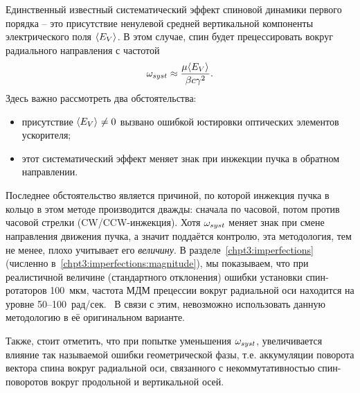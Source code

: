 Единственный известный систематический эффект спиновой динамики
первого порядка -- это присутствие ненулевой средней вертикальной
компоненты электрического поля $\avg{E_V}$. В этом случае, спин будет
прецессировать вокруг радиального направления с частотой~\cite[стр.~11]{BNL:Deuteron2008}
\[
\w_{syst} \approx \frac{\mu\avg{E_V}}{\beta c\gamma^2}.
\]
Здесь важно рассмотреть два обстоятельства:
\begin{itemize}
\item присутствие $\avg{E_V}\neq 0$ вызвано ошибкой юстировки оптических
  элементов ускорителя;
\item этот систематический эффект меняет знак при инжекции пучка в
  обратном направлении.
\end{itemize}
Последнее обстоятельство является причиной, по которой инжекция пучка
в кольцо в этом методе производится дважды: сначала по часовой, потом
против часовой стрелки (CW/CCW-инжекция). Хотя $\omega_{syst}$ меняет знак при смене
направления движения пучка, а значит поддаётся контролю, эта методология, тем не менее,
плохо учитывает его \emph{величину}. В разделе~\ref{chpt3:imperfections} 
(численно в~\ref{chpt3:imperfections:magnitude}), мы показываем, что при реалистичной величине 
(стандартного отклонения) ошибки установки спин-ротаторов 100~мкм, 
частота МДМ прецессии вокруг радиальной оси находится на уровне 50--100~рад/сек.~\cite{Senichev:FDM} 
В связи с этим, невозможно использовать данную методологию в её оригинальном варианте.

Также, стоит отметить, что при попытке уменьшения $\omega_{syst}$, увеличивается влияние
так называемой ошибки геометрической фазы, т.е. аккумуляции поворота вектора спина вокруг радиальной оси, связанного с некоммутативностью спин-поворотов вокруг продольной и вертикальной осей.~\cite[стр.~23]{BNL:Deuteron2008} 